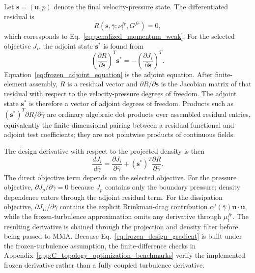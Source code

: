 Let $\mathbf{s}=(\mathbf{u},p)$ denote the final velocity-pressure state. The differentiated residual is
\begin{equation}
	R(\mathbf{s},\bar{\gamma};\nu_t^{fr},G^{fr})=0,
	\label{eq:frozen_flow_residual}
\end{equation}
which corresponds to Eq.~\ref{eq:penalized_momentum_weak}. For the selected objective $J_i$, the adjoint state $\mathbf{s}^*$ is found from
\begin{equation}
	\left(\frac{\partial R}{\partial \mathbf{s}}\right)^T
	\mathbf{s}^*
	=
	-\left(\frac{\partial J_i}{\partial \mathbf{s}}\right)^T .
	\label{eq:frozen_adjoint_equation}
\end{equation}
Equation~\ref{eq:frozen_adjoint_equation} is the adjoint equation. After finite-element assembly, $R$ is a residual vector and $\partial R/\partial\mathbf{s}$ is the Jacobian matrix of that residual with respect to the velocity-pressure degrees of freedom. The adjoint state $\mathbf{s}^*$ is therefore a vector of adjoint degrees of freedom. Products such as $(\mathbf{s}^*)^T\partial R/\partial\bar{\gamma}$ are ordinary algebraic dot products over assembled residual entries, equivalently the finite-dimensional pairing between a residual functional and adjoint test coefficients; they are not pointwise products of continuous fields.

The design derivative with respect to the projected density is then
\begin{equation}
	\frac{dJ_i}{d\bar{\gamma}}
	=
	\frac{\partial J_i}{\partial\bar{\gamma}}
	+
	(\mathbf{s}^*)^T
	\frac{\partial R}{\partial\bar{\gamma}} .
	\label{eq:frozen_design_gradient}
\end{equation}
The direct objective term depends on the selected objective. For the pressure objective, $\partial J_p/\partial\bar{\gamma}=0$ because $J_p$ contains only the boundary pressure; density dependence enters through the adjoint residual term. For the dissipation objective, $\partial J_D/\partial\bar{\gamma}$ contains the explicit Brinkman-drag contribution $\alpha'(\bar{\gamma})\mathbf{u}\cdot\mathbf{u}$, while the frozen-turbulence approximation omits any derivative through $\mu_t^{fr}$. The resulting derivative is chained through the projection and density filter before being passed to MMA. Because Eq.~\ref{eq:frozen_design_gradient} is built under the frozen-turbulence assumption, the finite-difference checks in Appendix~\ref{app:C_topology_optimization_benchmarks} verify the implemented frozen derivative rather than a fully coupled turbulence derivative.

